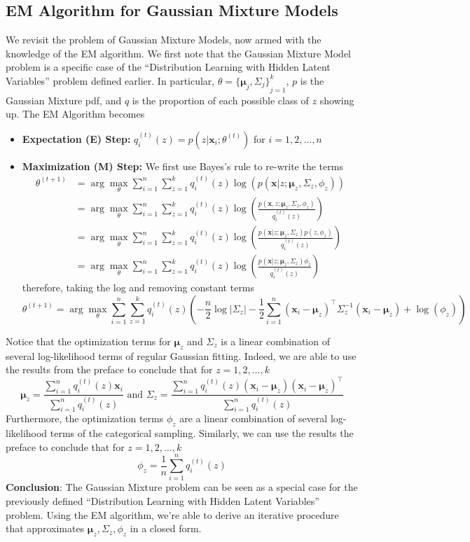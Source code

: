 \subsection{EM Algorithm for Gaussian Mixture Models}
We revisit the problem of Gaussian Mixture Models, now armed with the knowledge of the EM algorithm. We first note that the Gaussian Mixture Model problem is a specific case of the ``Distribution Learning with Hidden Latent Variables'' problem defined earlier. In particular, $\theta={\{\boldsymbol{\mu}_j,\Sigma_j\}}_{j=1}^k$, $p$ is the Gaussian Mixture pdf, and $q$ is the proportion of each possible class of $z$ showing up. The EM Algorithm becomes
\begin{itemize}
    \item \textbf{Expectation (E) Step:} $q_i^{(t)}(z)=p(z|\mathbf{x}_i;\theta^{(t)})$ for $i=1,2,\dots,n$
    \item \textbf{Maximization (M) Step:} We first use Bayes's rule to re-write the terms
    \begin{align*}
        \theta^{(t+1)} 
        &= \arg\max_{\theta} \sum_{i=1}^n \sum_{z=1}^k q_i^{(t)}(z) \log(p(\mathbf{x}|z;\boldsymbol{\mu}_z,\Sigma_z,\phi_z)) \\
        &= \arg\max_{\theta} \sum_{i=1}^n \sum_{z=1}^k q_i^{(t)}(z) \log\left(\frac{p(\mathbf{x},z;\boldsymbol{\mu}_z,\Sigma_z,\phi_z)}{q_i^{(t)}(z)}\right) \\
        &= \arg\max_{\theta} \sum_{i=1}^n \sum_{z=1}^k q_i^{(t)}(z) \log\left(\frac{p(\mathbf{x}|z;\boldsymbol{\mu}_z,\Sigma_z)p(z,\phi_z)}{q_i^{(t)}(z)}\right) \\
        &= \arg\max_{\theta} \sum_{i=1}^n \sum_{z=1}^k q_i^{(t)}(z) \log\left(\frac{p(\mathbf{x}|z;\boldsymbol{\mu}_z,\Sigma_z)\phi_z}{q_i^{(t)}(z)}\right)
    \end{align*}
    therefore, taking the log and removing constant terms
    \[
        \theta^{(t+1)} = \arg\max_{\theta} \sum_{i=1}^n \sum_{z=1}^k q_i^{(t)}(z) 
        \left(
            -\frac{n}{2} \log |\Sigma_z|
            - \frac{1}{2} \sum_{i=1}^n (\mathbf{x}_i - \boldsymbol{\mu}_z)^\top \Sigma_z^{-1} (\mathbf{x}_i - \boldsymbol{\mu}_z)
            + \log(\phi_z)
        \right)
    \]
\end{itemize}
Notice that the optimization terms for $\boldsymbol{\mu}_z$ and $\Sigma_z$ is a linear combination of several log-likelihood terms of regular Gaussian fitting. Indeed, we are able to use the results from the preface to conclude that for $z=1,2,\dots,k$
\[
\boldsymbol{\mu}_z = \frac{\sum_{i=1}^n q_i^{(t)}(z) \mathbf{x}_i}{\sum_{i=1}^n q_i^{(t)}(z)}
\text{ and }
\Sigma_z = \frac{\sum_{i=1}^n q_i^{(t)}(z) (\mathbf{x}_i-\boldsymbol{\mu}_z)(\mathbf{x}_i-\boldsymbol{\mu}_z)^\top}{\sum_{i=1}^n q_i^{(t)}(z)}
\]
Furthermore, the optimization terms $\phi_z$ are a linear combination of several log-likelihood terms of the categorical sampling. Similarly, we can use the results the preface to conclude that for $z=1,2,\dots,k$
\[
\phi_z = \frac{1}{n} \sum_{i=1}^n q_i^{(t)}(z)
\]
\textbf{Conclusion}: The Gaussian Mixture problem can be seen as a special case for the previously defined ``Distribution Learning with Hidden Latent Variables'' problem. Using the EM algorithm, we're able to derive an iterative procedure that approximates $\boldsymbol{\mu}_z,\Sigma_z,\phi_z$ in a closed form.
